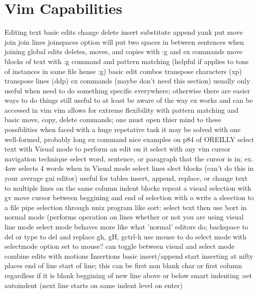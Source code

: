 \documentclass[12pt]{book}
\begin{document}
\section{Vim Capabilities}
Editing text
  basic edits
    change
    delete
    insert
    substitute
    append
    yank
    put
    move
    join
      join lines
        joinspaces option will put two spaces in between sentences when joining
    global edits
      deletes, moves, and copies with :g and ex commands
      move blocks of text
        with :g command and pattern matching (helpful if applies to tons of instances in same file hense :g)
    basic edit combos
      transpose characters (xp)
      transpose lines (ddp)
    ex commands (maybe don't need this section)
      usually only useful when need to do something specific everywhere; otherwise there are easier ways to do things
      still useful to at least be aware of the way ex works and can be accessed in vim
      vim allows for extreme flexibility with pattern matching and basic move, copy, delete commands; one must open thier mind to these possiblities when faced with a huge repetative task
      it may be solved with one well-formed, probably long ex command
      nice examples on p84 of OREILLY
    select text with Visual mode to perform an edit on it
      select with any vim cursor navigation technique
      select word, sentence, or paragraph that the cursor is in; ex. 4aw selects 4 words when in Visual mode
      select lines
      slect blocks (can't do this in your average gui editor)
        useful for tables
        insert, append, replace, or change text to multiple lines on the same column
        indent blocks
      repeat a visual selection with gv
      move cursor between beggining and end of selection with o
      write a sleection to a file
      pipe selection through unix program like sort: select text then use !sort in normal mode (performs operation on lines whether or not you are using visual line mode
      select mode
        behaves more like what 'normal' editors do; backspace to del or type to del and replace
        gh, gH, gctrl-h
        use mouse to do select mode with selectmode option set to mouse?
        can toggle between visual and select mode
    combine edits with motions
  Insertions
    basic insert/append
      start inserting at nifty places
        end of line
        start of line; this can be first non blank char or first column regardless if it is blank
        beggining of new line above or below
        smart indenting
          :set autoindent (next line starts on same indent level on enter)
\end{document}
